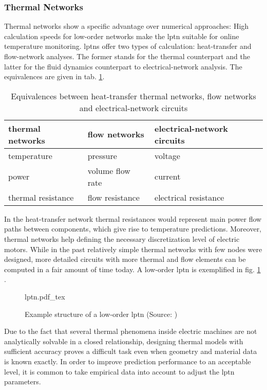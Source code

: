 \subsubsection{Thermal Networks}
Thermal networks show a specific advantage over numerical approaches:
High calculation speeds for low-order networks make the \gls{lptn} suitable for online temperature monitoring.
\glspl{lptn} offer two types of calculation: heat-transfer and flow-network analyses.
The former stands for the thermal counterpart and the latter for the fluid dynamics counterpart to electrical-network analysis.
The equivalences are given in tab. \ref{tab:heat-transfer}.
\begin{table}
		\caption{Equivalences between heat-transfer thermal networks, flow networks and electrical-network circuits}
		\label{tab:heat-transfer}
		\centering
		\begin{tabular}{l l l}
			\toprule
			thermal networks & flow networks & electrical-network circuits \\
			\midrule
			temperature & pressure & voltage\\
			power & volume flow rate & current\\
			thermal resistance & flow resistance & electrical resistance \\
			\bottomrule
		\end{tabular}
\end{table}

In the heat-transfer network thermal resistances would represent main power flow paths between components, which give rise to temperature predictions.
Moreover, thermal networks help defining the necessary discretization level of electric motors.
While in the past relatively simple thermal networks with few nodes were designed, more detailed circuits with more thermal and flow elements can be computed in a fair amount of time today.
A low-order \gls{lptn} is exemplified in fig. \ref{fig:lptn} \cite{WaBo2016}.
\begin{figure}
	\centering
	\def\svgwidth{0.8\columnwidth}
         {lptn.pdf_tex}
         \caption{Example structure of a low-order \gls{lptn} (Source: \cite{WaBo2016})}
	\label{fig:lptn}
\end{figure}

Due to the fact that several thermal phenomena inside electric machines are not analytically solvable in a closed relationship, designing thermal models with sufficient accuracy proves a difficult task even when geometry and material data is known exactly. 
In order to improve prediction performance to an acceptable level, it is common to take empirical data into account to adjust the \gls{lptn} parameters.

